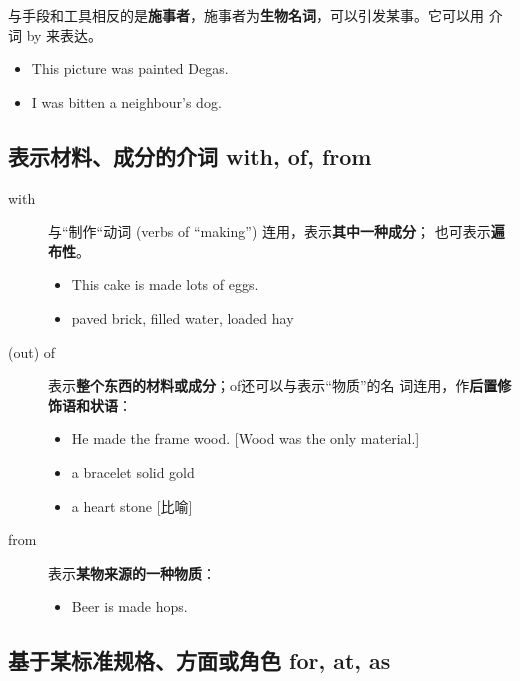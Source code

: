 与手段和工具相反的是\textbf{施事者}，施事者为\textbf{生物名词}，可以引发某事。它可以用
介词 by 来表达。
\begin{itemize}
\item This picture was painted  Degas.

\item I was bitten  a neighbour's dog.
\end{itemize}

\subsection{表示材料、成分的介词 with, of, from}

\begin{description}
\item[with] 与“制作“动词 (verbs of ``making'') 连用，表示\textbf{其中一种成分}；
  也可表示\textbf{遍布性}。
  \begin{itemize}
  \item This cake is made  lots of eggs.
  \item paved  brick, filled  water, loaded  hay
  \end{itemize}

\item[(out) of] 表示\textbf{整个东西的材料或成分}；of还可以与表示“物质”的名
  词连用，作\textbf{后置修饰语和状语}：
  \begin{itemize}
  \item He made the frame  wood. [Wood was the only material.]
  \item a bracelet  solid gold
  \item a heart  stone [比喻]
  \end{itemize}

\item[from] 表示\textbf{某物来源的一种物质}：
  \begin{itemize}
  \item Beer is made  hops.
  \end{itemize}
\end{description}

\subsection{基于某标准规格、方面或角色 for, at, as}


